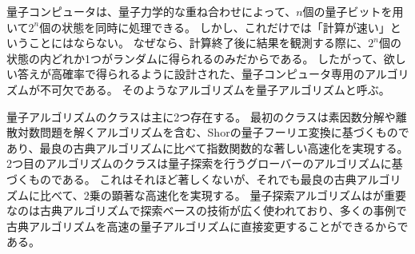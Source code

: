 \begin{comment}
    量子アルゴリズムについての記述
    24
\end{comment}

量子コンピュータは、量子力学的な重ね合わせによって、$n$個の量子ビットを用いて$2^n$個の状態を同時に処理できる。
しかし、これだけでは「計算が速い」ということにはならない。
なぜなら、計算終了後に結果を観測する際に、$2^n$個の状態の内どれか1つがランダムに得られるのみだからである。
したがって、欲しい答えが高確率で得られるように設計された、量子コンピュータ専用のアルゴリズムが不可欠である。
そのようなアルゴリズムを量子アルゴリズムと呼ぶ\cite{QuantumDojo}。



量子アルゴリズムのクラスは主に2つ存在する。
最初のクラスは素因数分解や離散対数問題を解くアルゴリズムを含む、Shorの量子フーリエ変換に基づくものであり、最良の古典アルゴリズムに比べて指数関数的な著しい高速化を実現する。
2つ目のアルゴリズムのクラスは量子探索を行うグローバーのアルゴリズムに基づくものである。
これはそれほど著しくないが、それでも最良の古典アルゴリズムに比べて、2乗の顕著な高速化を実現する。
量子探索アルゴリズムはが重要なのは古典アルゴリズムで探索ベースの技術が広く使われており、多くの事例で古典アルゴリズムを高速の量子アルゴリズムに直接変更することができるからである\cite{QuantumComputation&Infomation2}。